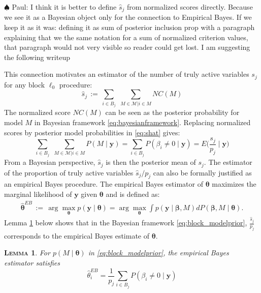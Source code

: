 \documentclass[aos]{imsart}
\theoremstyle{plain}
\newtheorem{lem}{\textsc{Lemma}}[section]
\newcommand{\paul}[1]{{\small{\color{green} \sf $\spadesuit$ Paul: #1}}}
\newcommand{\bs}{\boldsymbol}
\begin{document}
\paul{I think it is better to define $\hat{s}_j$ from normalized scores directly. Because we see it as a Bayesian object only for the connection to Empirical Bayes. If we keep it as it was: defining it as sum of posterior inclusion prop with a paragraph explaining that we the same notation for a sum of normalized criterion values, that paragraph would not very visible so reader could get lost. I am suggesting the following writeup}

This connection motivates an estimator of the number of truly active variables $s_j$ for any block $\ell_0$ procedure:
\begin{equation}\label{eq:shat}
    \widehat{s}_j \,:=\, \sum_{i\in B_j}\,\,\sum_{M\in \mathcal{M} | i \in M}NC(M)
\end{equation}
The normalized score $NC(M)$ can be seen as the posterior probability for model $M$ in Bayesian framework \eqref{eq:bayesianframework}. Replacing normalized scores  by posterior model probabilities in \eqref{eq:shat} gives:
\begin{equation*}
    \sum_{i\in B_j}\,\,\sum_{M\in \mathcal{M} | i \in M}P(M\mid \bs y) = \sum_{i\in B_j}P(\beta_i \neq 0 \mid \bs y) = E\Big(\frac{s_j}{p_j} \mid \bs y\Big)
\end{equation*}
From a Bayesian perspective, $\widehat{s}_j$ is then the posterior mean of $s_j$. The estimator of the proportion of truly active variables $\widehat{s}_j/p_j$ can also be formally justified as an empirical Bayes procedure. The empirical Bayes estimator of $\bs \theta$ maximizes the marginal likelihood of $\bs y$ given $\bs \theta$ and is defined as:
\begin{align}
\hat{\bs \theta}^{EB}\,:=\, \arg\max_{\bs \theta} p(\bs y \mid \bs \theta)=
\arg\max_{\bs \theta} \int p(\bs y \mid \bs \beta, M) d P(\bs \beta, M \mid \bs \theta).
\nonumber
\end{align}
 Lemma \ref{lem:empiricalbayesinterpret} below shows that in the Bayesian framework \eqref{eq:block_modelprior}, $\frac{\widehat{s}_j}{p_j}$ corresponds to the empirical Bayes estimate of $\bs \theta$.
\begin{lem}\label{lem:empiricalbayesinterpret} For $p(M \mid \bs \theta)$ in \eqref{eq:block_modelprior}, the empirical Bayes estimator satisfies $$\hat{\theta}^{EB}_i = \frac{1}{p_j}\sum_{i\in B_j}P(\beta_i \neq 0 \mid \bs y)$$
\end{lem}
\end{document}
